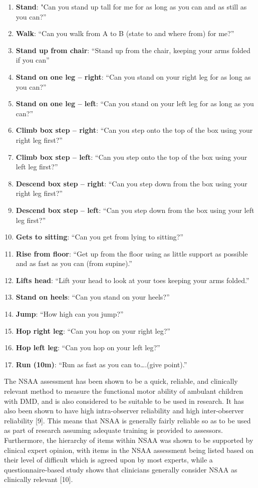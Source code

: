 \documentclass[12pt,twoside]{report}
\begin{document}
\begin{enumerate}
	\item \textbf{Stand}: "Can you stand up tall for me for as long as you can and as still as you can?”
	\item \textbf{Walk}: “Can you walk from A to B (state to and where from) for me?”
	\item \textbf{Stand up from chair}: “Stand up from the chair, keeping your arms folded if you can”
	\item \textbf{Stand on one leg – right}: “Can you stand on your right leg for as long as you can?”
	\item \textbf{Stand on one leg – left}: “Can you stand on your left leg for as long as you can?”
	\item \textbf{Climb box step – right}: “Can you step onto the top of the box using your right leg first?”
	\item \textbf{Climb box step – left}: “Can you step onto the top of the box using your left leg first?”
	\item \textbf{Descend box step – right}: “Can you step down from the box using your right leg first?”
	\item \textbf{Descend box step – left}: “Can you step down from the box using your left leg first?”
	\item \textbf{Gets to sitting}: “Can you get from lying to sitting?”
	\item \textbf{Rise from floor}: “Get up from the floor using as little support as possible and as fast as you can (from supine).”
	\item \textbf{Lifts head}: “Lift your head to look at your toes keeping your arms folded.”
	\item \textbf{Stand on heels}: “Can you stand on your heels?”
	\item \textbf{Jump}: “How high can you jump?”
	\item \textbf{Hop right leg}: “Can you hop on your right leg?”
	\item \textbf{Hop left leg}: “Can you hop on your left leg?”
	\item \textbf{Run (10m)}: “Run as fast as you can to….(give point).”
\end{enumerate}

\quad The NSAA assessment has been shown to be a quick, reliable, and clinically relevant method to measure the functional motor ability of ambulant children with DMD, and is also considered to be suitable to be used in research. It has also been shown to have high intra-observer reliability and high inter-observer reliability [9]. This means that NSAA is generally fairly reliable so as to be used as part of research assuming adequate training is provided to assessors. Furthermore, the hierarchy of items within NSAA was shown to be supported by clinical expert opinion, with items in the NSAA assessment being listed based on their level of difficult which is agreed upon by most experts, while a questionnaire-based study shows that clinicians generally consider NSAA as clinically relevant [10].\\
\end{document}

